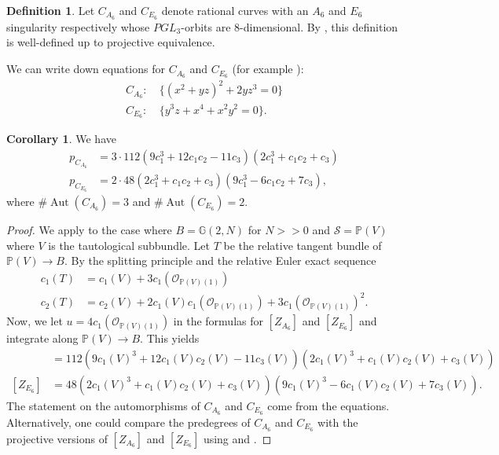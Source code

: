 \documentclass{article}
\theoremstyle{definition}
\newtheorem{cor}[thm]{Corollary}
\newtheorem{defn}[thm]{Definition}
\newcommand{\on}{\operatorname}
\newcommand{\mb}{\mathbb}
\newcommand{\mc}{\mathcal}
\newcommand{\ms}{\mathscr}
\begin{document}
\begin{defn}
Let $C_{A_6}$ and $C_{E_6}$ denote rational curves with an $A_6$ and $E_6$ singularity respectively whose $PGL_3$-orbits are 8-dimensional. By , this definition is well-defined up to projective equivalence.
\end{defn}

 We can write down equations for $C_{A_6}$ and $C_{E_6}$ (for example \cite[Section 3.4]{Nejad2}):
\begin{align*}
    C_{A_6}:\ &\{(x^2+yz)^2+2yz^3=0\}\\
    C_{E_6}:\ &\{y^3z+x^4+x^2y^2=0\}.
\end{align*}

\begin{cor}
\label{A6E6orbit}
We have
\begin{align*}
    p_{C_{A_6}}&= 3\cdot112 (9 c_1^3 + 12 c_1 c_2 - 11 c_3) (2 c_1^3 + c_1 c_2 + c_3)\\
    p_{C_{E_6}}&= 2\cdot 48 (2 c_1^3 + c_1 c_2 + c_3) (9 c_1^3 - 6 c_1 c_2 + 7 c_3),
\end{align*}
where $\#\on{Aut}(C_{A_6})=3$ and $\#\on{Aut}(C_{E_6})=2$. 
\end{cor}

\begin{proof}
We apply  to the case where $B=\mb{G}(2,N)$ for $N>>0$ and $\mc{S}=\mb{P}(V)$ where $V$ is the tautological subbundle. Let $T$ be the relative tangent bundle of $\mb{P}(V)\to B$. By the splitting principle and the relative Euler exact sequence
\begin{align*}
    c_1(T)&= c_1(V) + 3c_1(\ms{O}_{\mb{P}(V)(1)}) \\
    c_2(T) &= c_2(V) + 2 c_1(V) c_1(\ms{O}_{\mb{P}(V)(1)}) + 3 c_1(\ms{O}_{\mb{P}(V)(1)})^2.
\end{align*}
Now, we let $u=4c_1(\ms{O}_{\mb{P}(V)(1)})$ in the formulas for $[Z_{A_6}]$ and $[Z_{E_6}]$  and integrate along $\mb{P}(V)\to B$. This yields
\begin{align*}
    [Z_{A_6}]&= 112 (9 c_1(V)^3 + 12 c_1(V) c_2(V) - 11 c_3(V)) (2 c_1(V)^3 + c_1(V) c_2(V) + c_3(V))\\
    [Z_{E_6}]&= 48 (2 c_1(V)^3 + c_1(V) c_2(V) + c_3(V)) (9 c_1(V)^3 - 6 c_1(V) c_2(V) + 7 c_3(V)).
\end{align*}
The statement on the automorphisms of $C_{A_6}$ and $C_{E_6}$ come from the equations. Alternatively, one could compare the predegrees of $C_{A_6}$ and $C_{E_6}$ with the projective versions of $[Z_{A_6}]$ and $[Z_{E_6}]$ using \cite[Examples 5.2 and 5.4]{AF00} and .
\end{proof}
\end{document}
